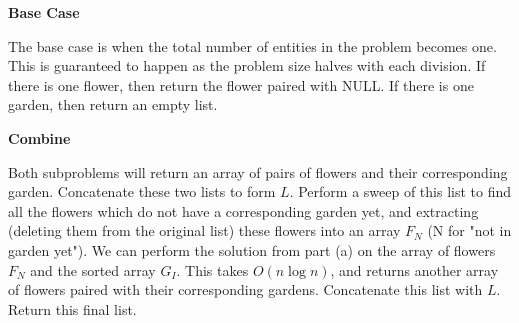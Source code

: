 \documentclass{article}
\begin{document}
\begin{solution}
\begin{enumerate}[label = (\alph*)]
    \pagebreak

    \textbf{Base Case}

    The base case is when the total number of entities in the problem becomes one.
    This is guaranteed to happen as the problem size halves with each division.
    If there is one flower, then return the flower paired with \textsc{NULL}. 
    If there is one garden, then return an empty list.

    \textbf{Combine}

    Both subproblems will return an array of pairs of flowers and their corresponding garden.
    Concatenate these two lists to form $L$. Perform a sweep of this list to find all the flowers which do not have a corresponding garden yet,
    and extracting (deleting them from the original list) these flowers into an array $F_N$ (N for "not in garden yet").
    We can perform the solution from part (a) on the array of flowers $F_N$ and the sorted array $G_I$.
    This takes $O(n\log n)$, and returns another array of flowers paired with their corresponding gardens.
    Concatenate this list with $L$. Return this final list.



\end{enumerate}
\end{solution}
\end{document}
